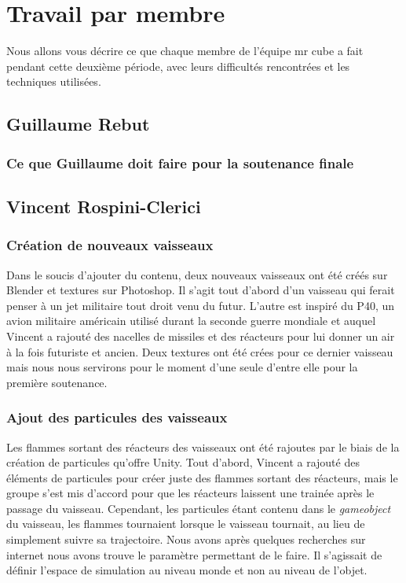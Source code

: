 \documentclass[10pt, titlepage]{report}
\begin{document}
\chapter{Travail par membre}
Nous allons vous décrire ce que chaque membre de l'équipe mr cube a fait pendant cette deuxième période, avec leurs difficultés rencontrées et les techniques utilisées.

\section{Guillaume Rebut}

\subsection{Ce que Guillaume doit faire pour la soutenance finale}

\section{Vincent Rospini-Clerici}

\subsection{Création de nouveaux vaisseaux}
Dans le soucis d'ajouter du contenu, deux nouveaux vaisseaux ont été créés sur Blender et textures sur Photoshop. Il s'agit tout d'abord d'un vaisseau qui ferait penser à un jet militaire tout droit venu du futur. L'autre est inspiré du P40, un avion militaire américain utilisé durant la seconde guerre mondiale et auquel Vincent a rajouté des nacelles de missiles et des réacteurs pour lui donner un air à la fois futuriste et ancien. Deux textures ont été crées pour ce dernier vaisseau mais nous nous servirons pour le moment d'une seule d'entre elle pour la première soutenance.\\

\subsection{Ajout des particules des vaisseaux}
Les flammes sortant des réacteurs des vaisseaux ont été rajoutes par le biais de la création de particules qu'offre Unity. Tout d'abord, Vincent a rajouté des éléments de particules pour créer juste des flammes sortant des réacteurs, mais le groupe s'est mis d'accord pour que les réacteurs laissent une trainée après le passage du vaisseau. Cependant, les particules étant contenu dans le \textit{gameobject} du vaisseau, les flammes tournaient lorsque le vaisseau tournait, au lieu de simplement suivre sa trajectoire. Nous avons après quelques recherches sur internet nous avons trouve le paramètre permettant de le faire. Il s'agissait de définir l'espace de simulation au niveau monde et non au niveau de l'objet.\\
\end{document}
